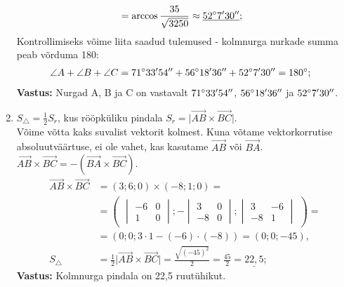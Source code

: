 \documentclass[10pt, a4paper]{article}
\begin{document}
\begin{enumerate}
\begin{align}
                        &=\arccos \frac{35}{\sqrt{3250}} \approx \underline{52\degree 7' 30''};
                \end{align}
                Kontrollimiseks võime liita saadud tulemused - kolmnurga nurkade summa peab võrduma 180\degree:
                \begin{align}
                    \nonumber
                    \angle A + \angle B + \angle C &= 71\degree 33' 54'' + 56\degree 18' 36'' + 52\degree 7' 30'' = 180\degree;
                \end{align}
                \textbf{Vastus: } Nurgad A, B ja C on vastavalt $71\degree 33' 54''$, $56\degree 18' 36''$ ja $52\degree 7' 30''$.
                
            \item
                $S_\triangle = \frac{1}{2}S_{r}$, kus rööpküliku pindala $S_{r} = \lvert \vec{AB} \times \vec{BC} \rvert$.\\
                Võime võtta kaks suvalist vektorit kolmest. Kuna võtame vektorkorrutise absoluutväärtuse, ei ole vahet, kas kasutame $\vec{AB}$ või $\vec{BA}$. $\vec{AB} \times \vec{BC} = -(\vec{BA} \times \vec{BC})$.
                \begin{align}
                    \nonumber
                    \vec{AB} \times \vec{BC} &= (3; 6; 0) \times (-8; 1; 0) = \\ \nonumber
                    &= \begin{pmatrix}
                        \begin{vmatrix}
                        -6 & 0\\
                        1 & 0
                        \end{vmatrix};
                        -\begin{vmatrix}
                        3 & 0\\
                        -8 & 0
                        \end{vmatrix};
                        \begin{vmatrix}
                        3 & -6\\
                        -8 & 1
                        \end{vmatrix}
                    \end{pmatrix} =  \\ \nonumber
                    &= (0; 0; 3 \cdot 1 - (-6) \cdot (-8)) = (0; 0; -45),\\ \nonumber
                    S_\triangle &= \frac{1}{2}\lvert \vec{AB} \times \vec{BC} \rvert = \frac{\sqrt{(-45)^2}}{2} = \frac{45}{2} = \underline{22,5};
                \end{align}
                \textbf{Vastus: }Kolmnurga pindala on 22,5 ruutühikut.
        \end{enumerate}
        
\end{document}

